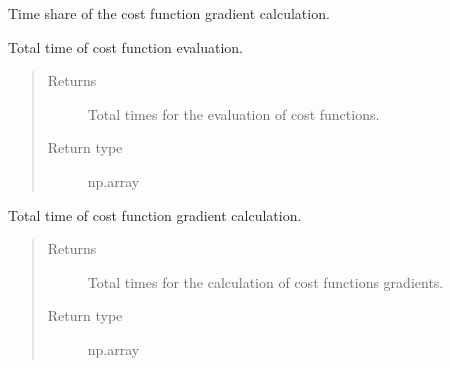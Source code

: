\documentclass[letterpaper,10pt,english]{sphinxmanual}
\begin{document}
\begin{fulllineitems}
\begin{fulllineitems}
\end{fulllineitems}


\begin{fulllineitems}
\label{\detokenize{qsim:qsim.analyser.Analyser.time_share_grad_fkt}}
Time share of the cost function gradient calculation.

\end{fulllineitems}


\begin{fulllineitems}
\label{\detokenize{qsim:qsim.analyser.Analyser.total_cost_fkt_time}}
Total time of cost function evaluation.
\begin{quote}\begin{description}
\item[{Returns}] \leavevmode
{} \textendash{} Total times for the evaluation of cost functions.

\item[{Return type}] \leavevmode
np.array

\end{description}\end{quote}

\end{fulllineitems}


\begin{fulllineitems}
\label{\detokenize{qsim:qsim.analyser.Analyser.total_grad_fkt_time}}
Total time of cost function gradient calculation.
\begin{quote}\begin{description}
\item[{Returns}] \leavevmode
{} \textendash{} Total times for the calculation of cost functions gradients.

\item[{Return type}] \leavevmode
np.array

\end{description}\end{quote}

\end{fulllineitems}


\end{fulllineitems}
\end{document}
